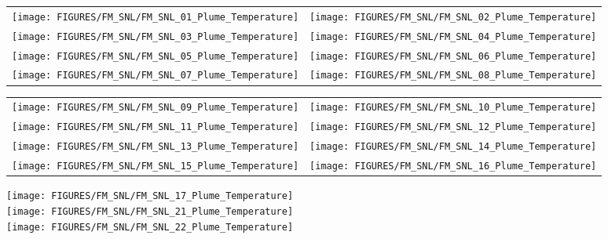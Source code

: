 \begin{figure}[p]
\begin{tabular*}{\textwidth}{l@{\extracolsep{\fill}}r}
\texttt{[image: FIGURES/FM\_SNL/FM\_SNL\_01\_Plume\_Temperature]} &
\texttt{[image: FIGURES/FM\_SNL/FM\_SNL\_02\_Plume\_Temperature]} \\
\texttt{[image: FIGURES/FM\_SNL/FM\_SNL\_03\_Plume\_Temperature]} &
\texttt{[image: FIGURES/FM\_SNL/FM\_SNL\_04\_Plume\_Temperature]} \\
\texttt{[image: FIGURES/FM\_SNL/FM\_SNL\_05\_Plume\_Temperature]} &
\texttt{[image: FIGURES/FM\_SNL/FM\_SNL\_06\_Plume\_Temperature]} \\
\texttt{[image: FIGURES/FM\_SNL/FM\_SNL\_07\_Plume\_Temperature]} &
\texttt{[image: FIGURES/FM\_SNL/FM\_SNL\_08\_Plume\_Temperature]}
\end{tabular*}
\end{figure}

\begin{figure}[p]
\begin{tabular*}{\textwidth}{l@{\extracolsep{\fill}}r}
\texttt{[image: FIGURES/FM\_SNL/FM\_SNL\_09\_Plume\_Temperature]} &
\texttt{[image: FIGURES/FM\_SNL/FM\_SNL\_10\_Plume\_Temperature]} \\
\texttt{[image: FIGURES/FM\_SNL/FM\_SNL\_11\_Plume\_Temperature]} &
\texttt{[image: FIGURES/FM\_SNL/FM\_SNL\_12\_Plume\_Temperature]} \\
\texttt{[image: FIGURES/FM\_SNL/FM\_SNL\_13\_Plume\_Temperature]} &
\texttt{[image: FIGURES/FM\_SNL/FM\_SNL\_14\_Plume\_Temperature]} \\
\texttt{[image: FIGURES/FM\_SNL/FM\_SNL\_15\_Plume\_Temperature]} &
\texttt{[image: FIGURES/FM\_SNL/FM\_SNL\_16\_Plume\_Temperature]}
\end{tabular*}
\end{figure}

\begin{figure}[p]
\begin{center}
\texttt{[image: FIGURES/FM\_SNL/FM\_SNL\_17\_Plume\_Temperature]} \\
\texttt{[image: FIGURES/FM\_SNL/FM\_SNL\_21\_Plume\_Temperature]} \\
\texttt{[image: FIGURES/FM\_SNL/FM\_SNL\_22\_Plume\_Temperature]}
\end{center}
\end{figure}

